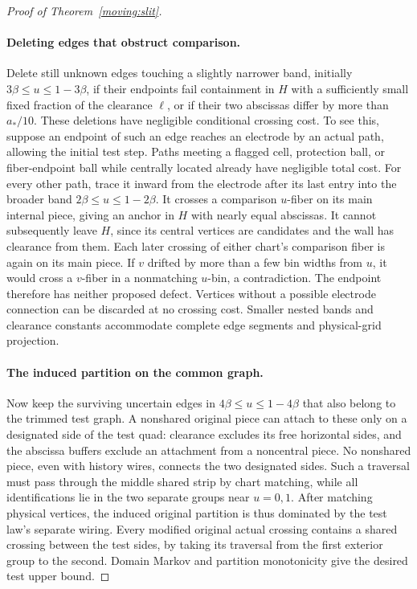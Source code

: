 \begin{proof}[Proof of Theorem~\ref{moving:slit}]
\paragraph{Deleting edges that obstruct comparison.}
Delete still unknown edges touching a slightly narrower band,
initially $3\beta\le u\le1-3\beta$, if their endpoints fail containment
in $H$ with a sufficiently small fixed fraction of the clearance
$\ell$, or if their two abscissas differ by more than $a_*/10$.
These deletions have negligible conditional crossing cost.  To see
this, suppose an endpoint of such an edge reaches an electrode by
an actual path, allowing the initial test step.  Paths meeting a
flagged cell, protection ball, or fiber-endpoint ball while centrally
located already have negligible total cost.  For every other path,
trace it inward from the electrode after its last entry into the
broader band $2\beta\le u\le1-2\beta$.  It crosses a comparison
$u$-fiber on its main internal piece, giving an anchor in $H$ with
nearly equal abscissas.  It cannot subsequently leave $H$, since its
central vertices are candidates and the wall has clearance from
them.  Each later crossing of either chart's comparison fiber is
again on its main piece.  If $v$ drifted by more than a few bin
widths from $u$, it would cross a $v$-fiber in a nonmatching $u$-bin,
a contradiction.  The endpoint therefore has neither proposed
defect.  Vertices without a possible electrode connection can be
discarded at no crossing cost.  Smaller nested bands and clearance
constants accommodate complete edge segments and physical-grid
projection.

\paragraph{The induced partition on the common graph.}
Now keep the surviving uncertain edges in
$4\beta\le u\le1-4\beta$ that also belong to the trimmed test graph.
A nonshared original piece can attach to these only on a designated
side of the test quad: clearance excludes its free horizontal sides,
and the abscissa buffers exclude an attachment from a noncentral
piece.  No nonshared piece, even with history wires, connects the
two designated sides.  Such a traversal must pass through the middle
shared strip by chart matching, while all identifications lie in the
two separate groups near $u=0,1$.  After matching physical vertices,
the induced original partition is thus dominated by the test law's
separate wiring.  Every modified original actual crossing contains
a shared crossing between the test sides, by taking its traversal
from the first exterior group to the second.  Domain Markov and
partition monotonicity give the desired test upper bound.


\end{proof}
